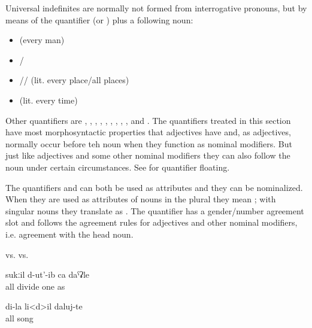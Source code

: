 Universal indefinites are normally not formed from interrogative pronouns, but by means of the quantifier   (or  ) plus a following noun:
%
\begin{itemize}
	\item	{}  (every man)
	\item	{}\slash{} 
	\item	{}\slash{}\slash{}  (lit. every place\slash all places)
	\item	{}  (lit. every time)
\end{itemize}
%
Other quantifiers are ,  , , , ,  , , ,  , and  . The quantifiers treated in this section have most morphosyntactic properties that adjectives have and, as adjectives, normally occur before teh noun when they function as nominal modifiers. But just like adjectives and some other nominal modifiers they can also follow the noun under certain circumstances. See  for quantifier floating. 

The quantifiers  and  can both be used as attributes and they can be nominalized. When they are used as attributes of nouns in the plural they mean ; with singular nouns they translate as . The quantifier  has a gender/number agreement slot and follows the agreement rules for adjectives and other nominal modifiers, i.e. agreement with the head noun.
%
\begin{exe}
	\ex	\label{ex:all girls all houses}
	\begin{xlist}
		\TabPositions{10.5em,12.5em}
		\ex	{} 		\tab	vs.	\tab	{} 
		\ex	{}		\tab	vs.	\tab	{} 
	\end{xlist}

	\ex	\label{ex:He divided all (the bread) like one (i.e. everyone got the same amount of bread)}
	\gll	sukːil	d-ut'-ib	ca	daˁʡle\\
		all	divide	one	as\\
	\glt	{}

	\ex	
	\gll	di-la	li<d>il	daluj-te\\
			all	song\\
	\glt	{}
\end{exe}

